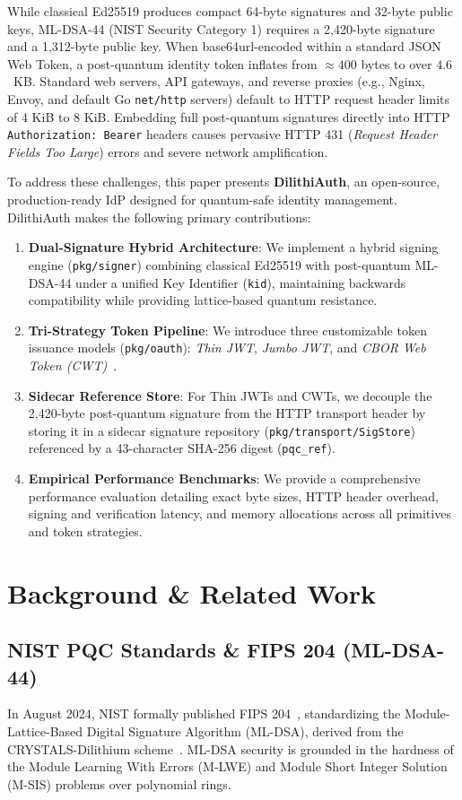\documentclass{article}
\begin{document}
\begin{IEEEkeywords}
While classical Ed25519 produces compact 64-byte signatures and 32-byte public keys, ML-DSA-44 (NIST Security Category 1) requires a 2,420-byte signature and a 1,312-byte public key. When base64url-encoded within a standard JSON Web Token, a post-quantum identity token inflates from $\approx 400$ bytes to over $4.6$~KB. Standard web servers, API gateways, and reverse proxies (e.g., Nginx, Envoy, and default Go \texttt{net/http} servers) default to HTTP request header limits of 4 KiB to 8 KiB. Embedding full post-quantum signatures directly into HTTP \texttt{Authorization: Bearer} headers causes pervasive HTTP 431 (\emph{Request Header Fields Too Large}) errors and severe network amplification.

To address these challenges, this paper presents \textbf{DilithiAuth}, an open-source, production-ready IdP designed for quantum-safe identity management. DilithiAuth makes the following primary contributions:
\begin{enumerate}
    \item \textbf{Dual-Signature Hybrid Architecture}: We implement a hybrid signing engine (\texttt{pkg/signer}) combining classical Ed25519 with post-quantum ML-DSA-44 under a unified Key Identifier (\texttt{kid}), maintaining backwards compatibility while providing lattice-based quantum resistance.
    \item \textbf{Tri-Strategy Token Pipeline}: We introduce three customizable token issuance models (\texttt{pkg/oauth}): \emph{Thin JWT}, \emph{Jumbo JWT}, and \emph{CBOR Web Token (CWT)}~\cite{rfc8392}.
    \item \textbf{Sidecar Reference Store}: For Thin JWTs and CWTs, we decouple the 2,420-byte post-quantum signature from the HTTP transport header by storing it in a sidecar signature repository (\texttt{pkg/transport/SigStore}) referenced by a 43-character SHA-256 digest (\texttt{pqc\_ref}).
    \item \textbf{Empirical Performance Benchmarks}: We provide a comprehensive performance evaluation detailing exact byte sizes, HTTP header overhead, signing and verification latency, and memory allocations across all primitives and token strategies.
\end{enumerate}

\section{Background \& Related Work}

\subsection{NIST PQC Standards \& FIPS 204 (ML-DSA-44)}
In August 2024, NIST formally published FIPS 204~\cite{fips204}, standardizing the Module-Lattice-Based Digital Signature Algorithm (ML-DSA), derived from the CRYSTALS-Dilithium scheme~\cite{ducas2018}. ML-DSA security is grounded in the hardness of the Module Learning With Errors (M-LWE) and Module Short Integer Solution (M-SIS) problems over polynomial rings.


\end{IEEEkeywords}
\end{document}
